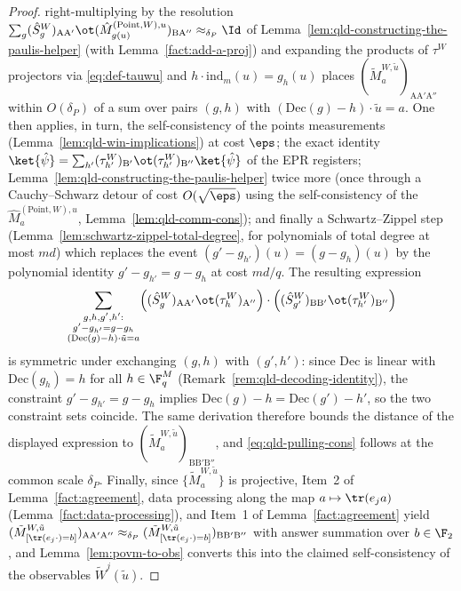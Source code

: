 \begin{proof}
	right-multiplying by the resolution $\sum_g (\hat{S}^W_g)_{\mathrm{A}\mathrm{A}'} \ot (\hat{M}^{(\mathrm{Point},W),u}_{g(u)})_{\mathrm{B}\mathrm{A}''} \approx_{\delta_P} \Id$ of Lemma~\ref{lem:qld-constructing-the-paulis-helper} (with Lemma~\ref{fact:add-a-proj}) and expanding the products of $\tau^W$ projectors via \eqref{eq:def-tauwu} and $h \cdot \mathrm{ind}_m(u) = g_h(u)$ places $(\tilde{M}^{W,\tilde{u}}_a)_{\mathrm{A}\mathrm{A}'\mathrm{A}''}$ within $O(\delta_P)$ of a sum over pairs $(g,h)$ with $(\mathrm{Dec}(g)-h)\cdot\tilde{u} = a$. One then applies, in turn, the self-consistency of the points measurements (Lemma~\ref{lem:qld-win-implications}) at cost $\eps$; the exact identity $\ket{\hat\psi} = \sum_{h'} (\tau^W_{h'})_{\mathrm{B}'} \ot (\tau^W_{h'})_{\mathrm{B}''} \ket{\hat\psi}$ of the EPR registers; Lemma~\ref{lem:qld-constructing-the-paulis-helper} twice more (once through a Cauchy--Schwarz detour of cost $O(\sqrt{\eps})$ using the self-consistency of the $\hat{M}^{(\mathrm{Point},W),u}_a$, Lemma~\ref{lem:qld-comm-cons}); and finally a Schwartz--Zippel step (Lemma~\ref{lem:schwartz-zippel-total-degree}, for polynomials of total degree at most $md$) which replaces the event $(g'-g_{h'})(u) = (g-g_h)(u)$ by the polynomial identity $g'-g_{h'} = g-g_h$ at cost $md/q$. The resulting expression
	\[
		\sum_{\substack{g,h,g',h': \\ g' - g_{h'} = g - g_h \\ (\mathrm{Dec}(g)-h)\cdot \tilde{u} = a}}
		\Bigl((\hat{S}^W_g)_{\mathrm{A}\mathrm{A}'} \ot (\tau_h^W)_{\mathrm{A}''} \Bigr) \cdot \Bigl( (\hat{S}^W_{g'})_{\mathrm{B}\mathrm{B}'} \ot (\tau_{h'}^W)_{\mathrm{B}''} \Bigr)
	\]
	is symmetric under exchanging $(g,h)$ with $(g',h')$: since $\mathrm{Dec}$ is linear with $\mathrm{Dec}(g_{h}) = h$ for all $h \in \F_q^M$ (Remark~\ref{rem:qld-decoding-identity}), the constraint $g' - g_{h'} = g - g_h$ implies $\mathrm{Dec}(g) - h = \mathrm{Dec}(g') - h'$, so the two constraint sets coincide. The same derivation therefore bounds the distance of the displayed expression to $(\tilde{M}^{W,\tilde{u}}_a)_{\mathrm{B}\mathrm{B}'\mathrm{B}''}$, and \eqref{eq:qld-pulling-cons} follows at the common scale $\delta_P$. Finally, since $\{\tilde{M}^{W,\tilde{u}}_a\}$ is projective, Item~2 of Lemma~\ref{fact:agreement}, data processing along the map $a \mapsto \tr(e_j a)$ (Lemma~\ref{fact:data-processing}), and Item~1 of Lemma~\ref{fact:agreement} yield $(\tilde{M}^{W,\tilde{u}}_{[\tr(e_j \cdot) = b]})_{\mathrm{A}\mathrm{A}'\mathrm{A}''} \approx_{\delta_P} (\tilde{M}^{W,\tilde{u}}_{[\tr(e_j \cdot) = b]})_{\mathrm{B}\mathrm{B}'\mathrm{B}''}$ with answer summation over $b \in \F_2$, and Lemma~\ref{lem:povm-to-obs} converts this into the claimed self-consistency of the observables $\tilde{W}^j(\tilde{u})$.
\end{proof}

